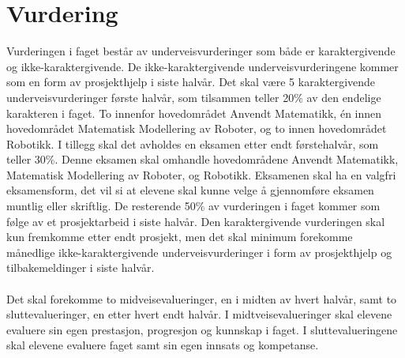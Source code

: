 \section*{Vurdering} \label{Sec: Vurdering}



        Vurderingen i faget består av underveisvurderinger som både er karaktergivende og ikke-karaktergivende. De ikke-karaktergivende underveisvurderingene kommer som en form av prosjekthjelp i siste halvår. Det skal være 5 karaktergivende underveisvurderinger første halvår, som tilsammen teller 20\% av den endelige karakteren i faget. To innenfor hovedområdet Anvendt Matematikk, én innen hovedområdet Matematisk Modellering av Roboter, og to innen hovedområdet Robotikk. I tillegg skal det avholdes en eksamen etter endt førstehalvår, som teller 30\%. Denne eksamen skal omhandle hovedområdene Anvendt Matematikk, Matematisk Modellering av Roboter, og Robotikk. Eksamenen skal ha en valgfri eksamensform, det vil si at elevene skal kunne velge å gjennomføre eksamen muntlig eller skriftlig. De resterende 50\% av vurderingen i faget kommer som følge av et prosjektarbeid i siste halvår. Den karaktergivende vurderingen skal kun fremkomme etter endt prosjekt, men det skal minimum forekomme månedlige ikke-karaktergivende underveisvurderinger i form av prosjekthjelp og tilbakemeldinger i siste halvår.\\\\
        Det skal forekomme to midveisevalueringer, en i midten av hvert halvår, samt to sluttevalueringer, en etter hvert endt halvår. I midtveisevalueringer skal elevene evaluere sin egen prestasjon, progresjon og kunnskap i faget. I sluttevalueringene skal elevene evaluere faget samt sin egen innsats og kompetanse.
